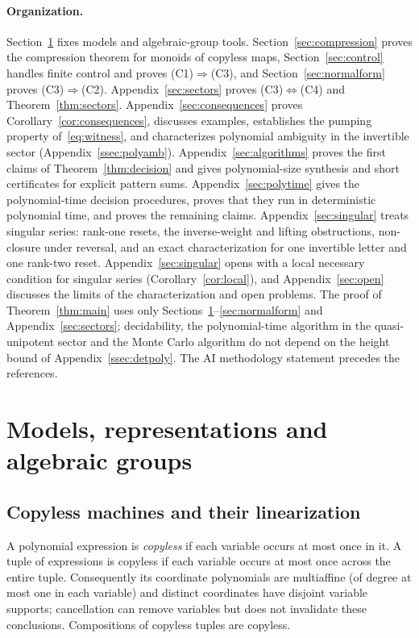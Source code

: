 \documentclass[11pt,letterpaper]{article}
\theoremstyle{definition}
\begin{document}
\paragraph{Organization.}
Section~\ref{sec:prelim} fixes models and algebraic-group tools. Section~\ref{sec:compression} proves the compression theorem for monoids of copyless maps, Section~\ref{sec:control} handles finite control and proves (C1)$\Rightarrow$(C3), and Section~\ref{sec:normalform} proves (C3)$\Rightarrow$(C2). Appendix~\ref{sec:sectors} proves (C3)$\Leftrightarrow$(C4) and Theorem~\ref{thm:sectors}. Appendix~\ref{sec:consequences} proves Corollary~\ref{cor:consequences}, discusses examples, establishes the pumping property of~\eqref{eq:witness}, and characterizes polynomial ambiguity in the invertible sector (Appendix~\ref{ssec:polyamb}). Appendix~\ref{sec:algorithms} proves the first claims of Theorem~\ref{thm:decision} and gives polynomial-size synthesis and short certificates for explicit pattern sums. Appendix~\ref{sec:polytime} gives the polynomial-time decision procedures, proves that they run in deterministic polynomial time, and proves the remaining claims. Appendix~\ref{sec:singular} treats singular series: rank-one resets, the inverse-weight and lifting obstructions, non-closure under reversal, and an exact characterization for one invertible letter and one rank-two reset. Appendix~\ref{sec:singular} opens with a local necessary condition for singular series (Corollary~\ref{cor:local}), and Appendix~\ref{sec:open} discusses the limits of the characterization and open problems. The proof of Theorem~\ref{thm:main} uses only Sections~\ref{sec:prelim}--\ref{sec:normalform} and Appendix~\ref{sec:sectors}; decidability, the polynomial-time algorithm in the quasi-unipotent sector and the Monte Carlo algorithm do not depend on the height bound of Appendix~\ref{ssec:detpoly}. The AI methodology statement precedes the references.

\section{Models, representations and algebraic groups}\label{sec:prelim}
\subsection{Copyless machines and their linearization}
A polynomial expression is \emph{copyless} if each variable occurs at most once in it. A tuple of expressions is copyless if each variable occurs at most once across the entire tuple. Consequently its coordinate polynomials are multiaffine (of degree at most one in each variable) and distinct coordinates have disjoint variable supports; cancellation can remove variables but does not invalidate these conclusions. Compositions of copyless tuples are copyless.
\end{document}
